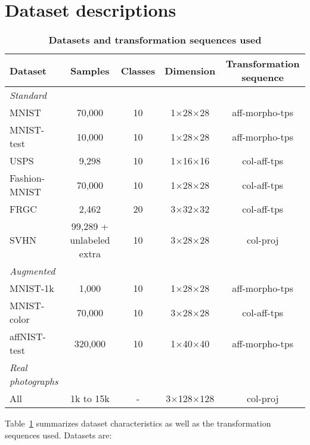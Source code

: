 \documentclass{article}
\begin{document}
\section{Dataset descriptions}\label{sec:dataset}
\vspace{-1.5em}
\begin{table}[h!]
  \small
  \caption{\bf Datasets and transformation sequences used}
  \centering
  \addtolength{\tabcolsep}{-4pt}
  \begin{tabular}{@{}lcccc@{}}\toprule
  Dataset & Samples & Classes & Dimension & Transformation sequence\\\midrule
  \textit{Standard}\\
  \quad MNIST~\cite{lecunGradientBasedLearningApplied1998} & 70,000 & 10 & 
  1$\times$28$\times$28 & aff-morpho-tps\\
  \quad MNIST-test~\cite{lecunGradientBasedLearningApplied1998} & 10,000 & 10 & 
  1$\times$28$\times$28 & aff-morpho-tps\\
  \quad USPS~\cite{hastie01statisticallearning} & 9,298 & 10 & 1$\times$16$\times$16 & 
  col-aff-tps\\
  \quad Fashion-MNIST~\cite{xiao2017fashion} & 70,000 & 10 & 1$\times$28$\times$28 & 
  col-aff-tps\\
  \quad FRGC~\cite{FRGC} & 2,462 & 20 & 3$\times$32$\times$32 & col-aff-tps\\
  \quad SVHN~\cite{netzer2011reading}& 99,289 + unlabeled extra & 10 & 3$\times$28$\times$28 
  & col-proj\\
  \midrule
  \textit{Augmented}\\
  \quad MNIST-1k & 1,000 & 10 & 1$\times$28$\times$28 & aff-morpho-tps\\
  \quad MNIST-color & 70,000 & 10 & 3$\times$28$\times$28 & col-aff-tps\\
  \quad affNIST-test & 320,000 & 10 & 1$\times$40$\times$40 & aff-morpho-tps\\
  \midrule
  \textit{Real photographs}\\
  \quad All & 1k to 15k & - & 3$\times$128$\times$128 & col-proj\\
  \bottomrule
  \end{tabular}
  \label{tab:dataset}
\end{table}
Table~\ref{tab:dataset} summarizes dataset characteristics as well as the transformation 
sequences used. Datasets are:
\end{document}
